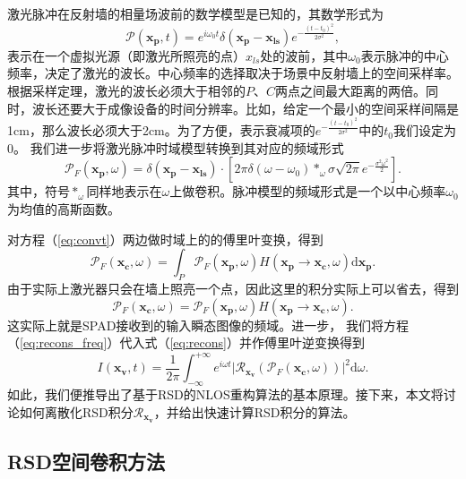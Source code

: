 \documentclass[master]{shtthesis}             %
\begin{document}
激光脉冲在反射墙的相量场波前的数学模型是已知的，其数学形式为
\begin{equation}\label{eq:impul}
 \mathcal{P}(\mathbf{x_p},t) = e^{i\omega_0 t}\delta(\mathbf{x_p}-\mathbf{x_{ls}})e^{-\frac{(t-t_0)^2}{2\sigma^2}},
\end{equation}
表示在一个虚拟光源（即激光所照亮的点）$x_{ls}$处的波前，其中$\omega_0$表示脉冲的中心频率，决定了激光的波长。中心频率的选择取决于场景中反射墙上的空间采样率。根据采样定理，激光的波长必须大于相邻的$P$、$C$两点之间最大距离的两倍。同时，波长还要大于成像设备的时间分辨率\citep{Liu2019}。比如，给定一个最小的空间采样间隔是1cm，那么波长必须大于2cm。为了方便，表示衰减项的$e^{-\frac{(t-t_0)^2}{2\sigma^2}}$中的$t_0$我们设定为0。
我们进一步将激光脉冲时域模型转换到其对应的频域形式
\begin{equation} \label{eq:impul_freq}
 \mathcal{P}_F(\mathbf{x_p},\omega) = \delta(\mathbf{x_p}-\mathbf{x_{ls}})\cdot \left[ 2\pi\delta(\omega-\omega_0)*_\omega\sigma\sqrt{2\pi}e^{-\frac{\sigma^2\omega^2}{2}} \right].
\end{equation}
其中，符号$*_\omega$同样地表示在$\omega$上做卷积。脉冲模型的频域形式是一个以中心频率$\omega_0$为均值的高斯函数。

对方程（\ref{eq:convt}）两边做时域上的的傅里叶变换，得到
\begin{equation}
  \mathcal{P}_F(\mathbf{x_c},\omega) = \int_P \mathcal{P}_F(\mathbf{x_p},\omega) H(\mathbf{x_p}\rightarrow \mathbf{x_c},\omega) \text{d}\mathbf{x_p}.
\end{equation}
由于实际上激光器只会在墙上照亮一个点，因此这里的积分实际上可以省去，得到
\begin{equation}\label{eq:input_trans}
  \mathcal{P}_F(\mathbf{x_c},\omega) = \mathcal{P}_F(\mathbf{x_p},\omega) H(\mathbf{x_p}\rightarrow \mathbf{x_c},\omega).
\end{equation}
这实际上就是SPAD接收到的输入瞬态图像的频域。进一步，
我们将方程（\ref{eq:recons_freq}）代入式（\ref{eq:recons}）并作傅里叶逆变换得到
\begin{equation}\label{eq:rsd_recons_pp}
  I(\mathbf{x_v},t)=\frac{1}{2\pi}\int_{-\infty}^{+\infty}e^{i\omega t}\Big| \mathcal{R}_{\mathbf{x_v}} \left( \mathcal{P}_F(\mathbf{x_c},\omega) \right) \Big|^2 \text{d}\omega.
\end{equation}
如此，我们便推导出了基于RSD的NLOS重构算法的基本原理。接下来，本文将讨论如何离散化RSD积分$\mathcal{R}_{\mathbf{x_v}}$，并给出快速计算RSD积分的算法。

\subsection{RSD空间卷积方法}
\end{document}
